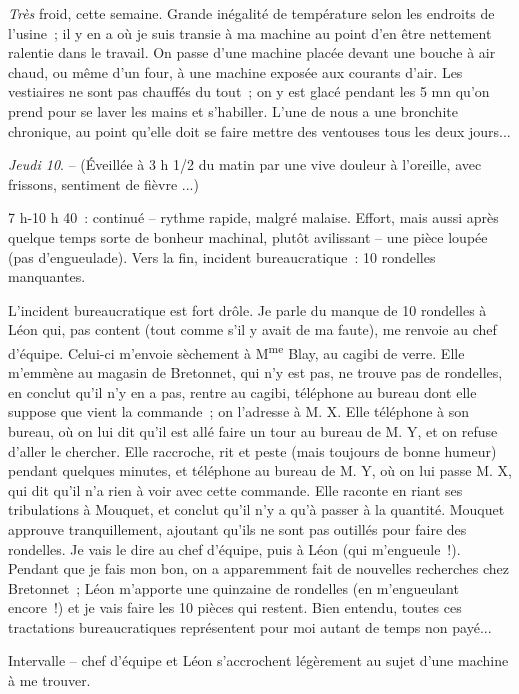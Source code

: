 \documentclass[french,twoside]{book} %
\begin{document}
{\itshape Très} froid, cette semaine. Grande inégalité de température selon les endroits de l'usine ; il y en a où je suis transie à ma machine au point d'en être nettement ralentie dans le travail. On passe d'une machine placée devant une bouche à air chaud, ou même d'un four, à une machine exposée aux courants d'air. Les vestiaires ne sont pas chauffés du tout ; on y est glacé pendant les 5 mn qu'on prend pour se laver les mains et s'habiller. L'une de nous a une bronchite chronique, au point qu'elle doit se faire mettre des ventouses tous les deux jours...\par
{\itshape Jeudi 10}. – (Éveillée à 3 h 1/2 du matin par une vive douleur à l'oreille, avec frissons, sentiment de fièvre ...)\par
7 h-10 h 40 : continué – rythme rapide, malgré malaise. Effort, mais aussi après quelque temps sorte de bonheur machinal, plutôt avilissant – une pièce loupée (pas d'engueulade). Vers la fin, incident bureaucratique : 10 rondelles manquantes.\par
L'incident bureaucratique est fort drôle. Je parle du manque de 10 rondelles à Léon qui, pas content (tout comme s'il y avait de ma faute), me renvoie au chef d'équipe. Celui-ci m'envoie sèchement à M\textsuperscript{me} Blay, au cagibi de verre. Elle m'emmène au magasin de Bretonnet, qui n'y est pas, ne trouve pas de rondelles, en conclut qu'il n'y en a pas, rentre au cagibi, téléphone au bureau dont elle suppose que vient la commande ; on l'adresse à M. X. Elle téléphone à son bureau, où on lui dit qu'il est allé faire un tour au bureau de M. Y, et on refuse d'aller le chercher. Elle raccroche, rit et peste (mais toujours de bonne humeur) pendant quelques minutes, et téléphone au bureau de M. Y, où on lui passe M. X, qui dit qu'il n'a rien à voir avec cette commande. Elle raconte en riant ses tribulations à Mouquet, et conclut qu'il n'y a qu'à passer à la quantité. Mouquet approuve tranquillement, ajoutant qu'ils ne sont pas outillés pour faire des rondelles. Je vais le dire au chef d'équipe, puis à Léon (qui m'engueule !). Pendant que je fais mon bon, on a apparemment fait de nouvelles recherches chez Bretonnet ; Léon m'apporte une quinzaine de rondelles (en m'engueulant encore !) et je vais faire les 10 pièces qui restent. Bien entendu, toutes ces tractations bureaucratiques représentent pour moi autant de temps non payé...\par
Intervalle – chef d'équipe et Léon s'accrochent légèrement au sujet d'une machine à me trouver.\par
\end{document}
